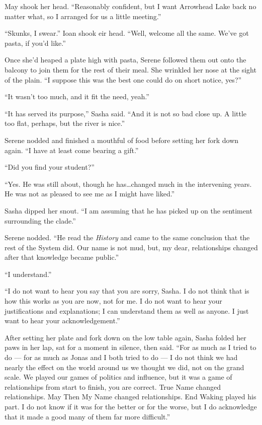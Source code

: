 May shook her head. ``Reasonably confident, but I want Arrowhead Lake back no matter what, so I arranged for us a little meeting.''

``Skunks, I swear.'' Ioan shook eir head. ``Well, welcome all the same. We've got pasta, if you'd like.''

Once she'd heaped a plate high with pasta, Serene followed them out onto the balcony to join them for the rest of their meal. She wrinkled her nose at the sight of the plain. ``I suppose this was the best one could do on short notice, yes?''

``It wasn't too much, and it fit the need, yeah.''

``It has served its purpose,'' Sasha said. ``And it is not so bad close up. A little too flat, perhaps, but the river is nice.''

Serene nodded and finished a mouthful of food before setting her fork down again. ``I have at least come bearing a gift.''

``Did you find your student?''

``Yes. He was still about, though he has\ldots changed much in the intervening years. He was not as pleased to see me as I might have liked.''

Sasha dipped her snout. ``I am assuming that he has picked up on the sentiment surrounding the clade.''

Serene nodded. ``He read the \emph{History} and came to the same conclusion that the rest of the System did. Our name is not mud, but, my dear, relationships changed after that knowledge became public.''

``I understand.''

``I do not want to hear you say that you are sorry, Sasha. I do not think that is how this works as you are now, not for me. I do not want to hear your justifications and explanations; I can understand them as well as anyone. I just want to hear your acknowledgement.''

After setting her plate and fork down on the low table again, Sasha folded her paws in her lap, sat for a moment in silence, then said. ``For as much as I tried to do — for as much as Jonas and I both tried to do — I do not think we had nearly the effect on the world around us we thought we did, not on the grand scale. We played our games of politics and influence, but it was a game of relationships from start to finish, you are correct. True Name changed relationships. May Then My Name changed relationships. End Waking played his part. I do not know if it was for the better or for the worse, but I do acknowledge that it made a good many of them far more difficult.''

